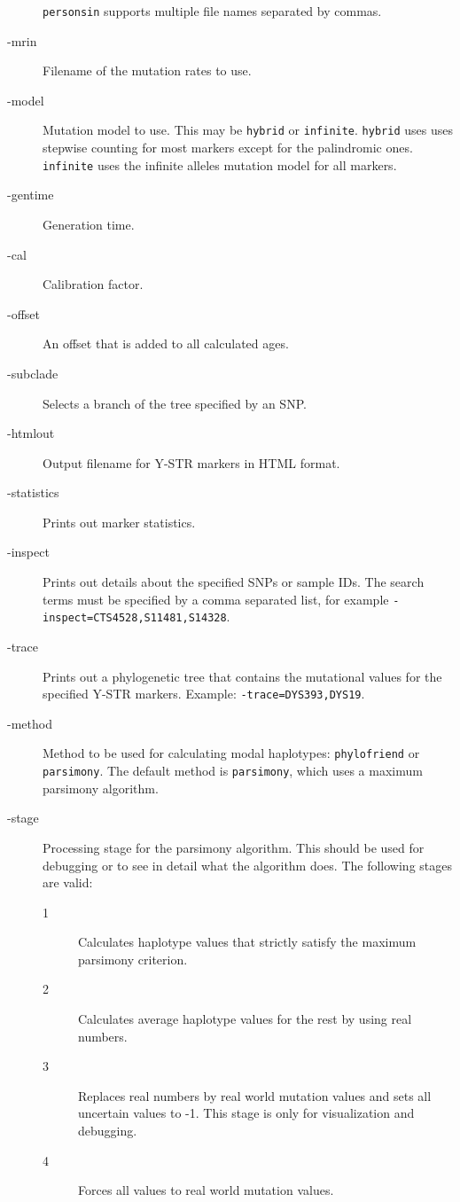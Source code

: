 \begin{description}
	\texttt{personsin} supports multiple file names separated by
	commas.
\item[-mrin] Filename of the mutation rates to use.
\item[-model] Mutation model to use. This may be \texttt{hybrid}
	or \texttt{infinite}. \texttt{hybrid} uses uses stepwise counting
	for most markers except for the palindromic ones. 
	\texttt{infinite} uses the infinite alleles mutation model for
	all markers.
\item[-gentime] Generation time.
\item[-cal] Calibration factor.
\item[-offset] An offset that is added to all calculated ages.
\item[-subclade] Selects a branch of the tree specified by an SNP.
\item[-htmlout] Output filename for Y-STR markers in HTML format.
\item[-statistics] Prints out marker statistics.
\item[-inspect] Prints out details about the specified SNPs or
	sample IDs. The search terms must be specified by a comma
	separated list, for example \texttt{-inspect=CTS4528,S11481,S14328}.
\item[-trace] Prints out a phylogenetic tree that contains the
	mutational values for the specified Y-STR markers. Example:
	\texttt{-trace=DYS393,DYS19}.
\item[-method] Method to be used for calculating modal haplotypes:
	\texttt{phylofriend} or \texttt{parsimony}. The default method
	is \texttt{parsimony}, which uses a maximum parsimony algorithm.
\item[-stage] Processing stage for the parsimony algorithm. This
	should be used for debugging or to see in detail what the algorithm
	does. The following stages are valid:
	\begin{description}
	\item[1] Calculates haplotype values that strictly satisfy
		the maximum parsimony criterion.
	\item[2] Calculates average haplotype values for the rest
		by using real numbers.
	\item[3] Replaces real numbers by real world mutation values
		and sets all uncertain values to -1.
		This stage is only for visualization and debugging.
	\item[4] Forces all values to real world mutation values.
	\end{description}
\end{description}

